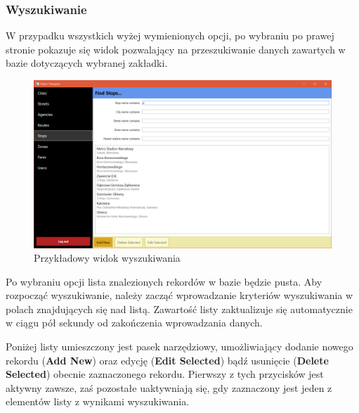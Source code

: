 \documentclass[10pt,a4paper]{article}
\begin{document}
\subsubsection{Wyszukiwanie}
W przypadku wszystkich wyżej wymienionych opcji, po wybraniu po prawej stronie pokazuje się widok pozwalający na przeszukiwanie danych zawartych w bazie dotyczących wybranej zakładki.
\begin{figure}[H]
	\centering
	\includegraphics[width=15cm]{screenshots/13_filter_stops.png}
	\caption{Przykładowy widok wyszukiwania}
\end{figure}
Po wybraniu opcji lista znalezionych rekordów w bazie będzie pusta. Aby rozpocząć wyszukiwanie, należy zacząć wprowadzanie kryteriów wyszukiwania w polach znajdujących się nad listą. Zawartość listy zaktualizuje się automatycznie w ciągu pół sekundy od zakończenia wprowadzania danych.

Poniżej listy umieszczony jest pasek narzędziowy, umożliwiający dodanie nowego rekordu (\textbf{Add New}) oraz edycję (\textbf{Edit Selected}) bądź usunięcie (\textbf{Delete Selected}) obecnie zaznaczonego rekordu. Pierwszy z tych przycisków jest aktywny zawsze, zaś pozostałe uaktywniają się, gdy zaznaczony jest jeden z elementów listy z wynikami wyszukiwania.
\end{document}
